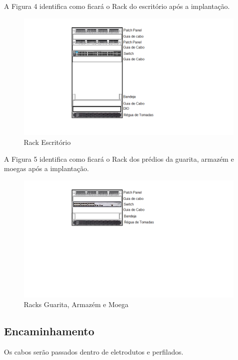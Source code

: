 \documentclass[	DIV=calc,%
							paper=a4,%
							fontsize=12pt,%
							onecolumn]{scrartcl}	 					%
\begin{document}
A Figura 4 identifica como ficará o Rack do escritório após a implantação.

\begin{figure}[H]
	\centering
	\includegraphics[width=\textwidth]{fig4}
	\caption{Rack Escritório}
	\label{fig4}
\end{figure}

A Figura 5 identifica como ficará o Rack dos prédios da guarita, armazém e moegas após a implantação.

\begin{figure}[H]
	\centering
	\includegraphics[width=\textwidth]{fig5}
	\caption{Racks Guarita, Armazém e Moega}
	\label{fig5}
\end{figure}


\subsection{Encaminhamento}
Os cabos serão passados dentro de eletrodutos e perfilados. 
\end{document}
